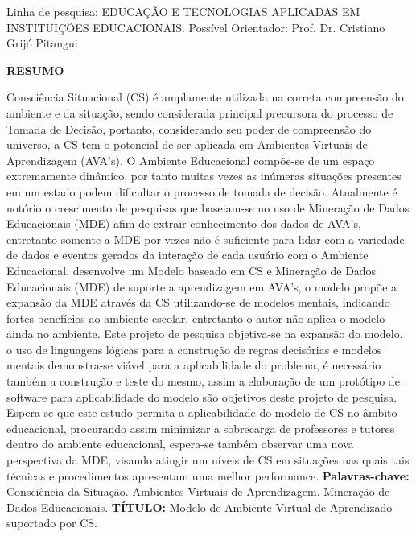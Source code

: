 \documentclass[
	oneside,
	12pt,				%
	a4paper,			%
	english,			%
	brazil,				%
	article
	]{abntex2}
\renewcommand{\imprimircapa}{%
	\begin{capa}%
		\center	
		{\ABNTEXchapterfont\imprimirinstituicao}
		\vfill
		\begin{center}
			\ABNTEXchapterfont\bfseries\imprimirtitulo
		\end{center}
		\vspace*{3cm}
		\begin{flushright}
		Linha de pesquisa: EDUCAÇÃO E TECNOLOGIAS APLICADAS EM INSTITUIÇÕES EDUCACIONAIS.
		\linebreak
		Possível Orientador: Prof. Dr. Cristiano Grijó Pitangui
		\end{flushright}
		\vfill
		\imprimirlocal 
		\linebreak		
		\imprimirdata
		\vspace*{1cm}
	\end{capa}
}
\begin{document}
 

\frenchspacing 

\imprimircapa

\textual

\OnehalfSpacing %
\begin{center}
	\ABNTEXchapterfont\bfseries RESUMO
\end{center}

Consciência Situacional (CS) é amplamente utilizada na correta compreensão do ambiente e da situação, sendo considerada principal precursora do processo de Tomada de Decisão, portanto, considerando seu poder de compreensão do universo, a CS tem o potencial de ser aplicada em Ambientes Virtuais de Aprendizagem (AVA’s).
O Ambiente Educacional compõe-se de um espaço extremamente dinâmico, por tanto muitas vezes as inúmeras situações presentes em um estado podem dificultar o processo de tomada de decisão. Atualmente é notório o crescimento de pesquisas que baseiam-se no uso de Mineração de Dados Educacionais (MDE) afim de extrair conhecimento dos dados de AVA's, entretanto somente a MDE por vezes não é suficiente para lidar com a variedade de dados e eventos gerados da interação de cada usuário com o Ambiente Educacional.  desenvolve um Modelo baseado em CS e Mineração de Dados Educacionais (MDE) de suporte a aprendizagem em AVA's, o modelo propõe a expansão da MDE através da CS utilizando-se de modelos mentais, indicando fortes benefícios ao ambiente escolar, entretanto o autor não aplica o modelo ainda no ambiente. Este projeto de pesquisa objetiva-se na expansão do modelo, o uso de linguagens lógicas para a construção de regras decisórias e modelos mentais demonstra-se viável para a aplicabilidade do problema, é necessário também a construção e teste do mesmo, assim a elaboração de um protótipo de software para aplicabilidade do modelo são objetivos deste projeto de pesquisa. Espera-se que este estudo permita a aplicabilidade do modelo de CS no âmbito educacional, procurando assim minimizar a sobrecarga de professores e tutores dentro do ambiente educacional, espera-se também observar uma nova perspectiva da MDE, visando atingir um níveis de CS em situações nas quais tais técnicas e procedimentos apresentam uma melhor performance. 
\linebreak\linebreak
\textbf{Palavras-chave:} Consciência da Situação. Ambientes Virtuais de Aprendizagem. Mineração de Dados Educacionais. 
\linebreak\linebreak
\textbf{TÍTULO:} Modelo de Ambiente Virtual de Aprendizado suportado por CS.
\end{document}

